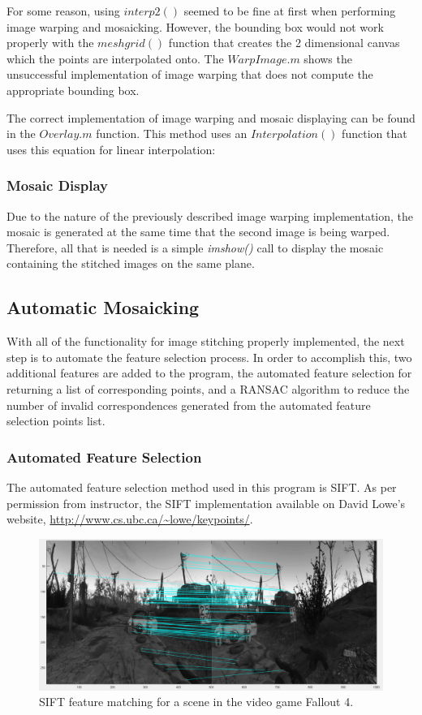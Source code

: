 \documentclass[12pt,journal,compsoc]{IEEEtran}
\begin{document}
For some reason, using $interp2()$ seemed to be fine at first when performing image warping and mosaicking. However, the bounding box would not work properly with the $meshgrid()$ function that creates the 2 dimensional canvas which the points are interpolated onto. The $WarpImage.m$ shows the unsuccessful implementation of image warping that does not compute the appropriate bounding box. 

The correct implementation of image warping and mosaic displaying can be found in the $Overlay.m$ function. This method uses an $Interpolation()$ function that uses this equation for linear interpolation:


\subsubsection{Mosaic Display}
Due to the nature of the previously described image warping implementation, the mosaic is generated at the same time that the second image is being warped. Therefore, all that is needed is a simple \textit{imshow()} call to display the mosaic containing the stitched images on the same plane.

\subsection{Automatic Mosaicking}
With all of the functionality for image stitching properly implemented, the next step is to automate the feature selection process. In order to accomplish this, two additional features are added to the program, the automated feature selection for returning a list of corresponding points, and a RANSAC algorithm to reduce the number of invalid correspondences generated from the automated feature selection points list.

\subsubsection{Automated Feature Selection}
The automated feature selection method used in this program is SIFT. As per permission from instructor, the SIFT implementation available on David Lowe's website, {\url{http://www.cs.ubc.ca/~lowe/keypoints/}}.
\begin{figure}[h]
	\centering
		  \centering
		  \includegraphics[width=1\linewidth]{img/rocket1}
		  \caption{SIFT feature matching for a scene in the video game Fallout 4.}
		  \label{fig:rocket1}
\end{figure}
\end{document}

